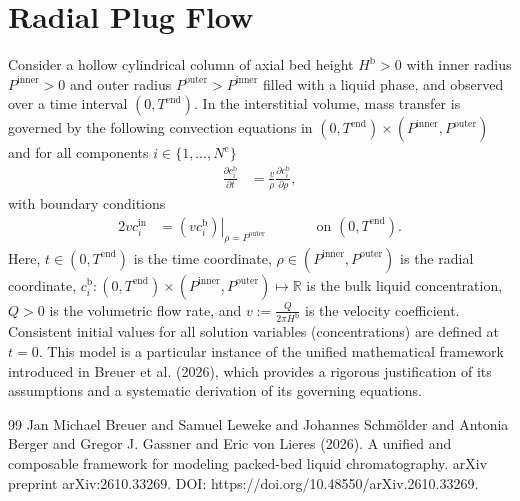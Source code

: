 \documentclass{article}
\begin{document}
\section*{Radial Plug Flow}
Consider a hollow cylindrical column of axial bed height $H^{\mathrm{b}} > 0$ with inner radius $P^{\mathrm{inner}} > 0$ and outer radius $P^{\mathrm{outer}} > P^{\mathrm{inner}}$ filled with a liquid phase, and observed over a time interval $(0, T^{\mathrm{end}})$.
In the interstitial volume, mass transfer is governed by the following convection equations in $(0, T^{\mathrm{end}})\times (P^{\mathrm{inner}}, P^{\mathrm{outer}})$ and for all components $i\in\{1, \dots, N^{\mathrm{c}} \}$
\begin{align}
    \frac{\partial c^{\mathrm{b}}_{i}}{\partial t}
    &= \frac{v}{\rho} \frac{\partial c^{\mathrm{b}}_{i}}{\partial \rho},
\end{align}
with boundary conditions
\begin{alignat}{2}
    v c^{\mathrm{in}}_{i}
    &= \left.\left( v c^{\mathrm{b}}_{i} \right)\right|_{\rho=P^{\mathrm{outer}}}
    & & \qquad\text{on }(0, T^{\mathrm{end}}).
\end{alignat}
Here, $t\in (0, T^{\mathrm{end}})$ is the time coordinate, $\rho\in (P^{\mathrm{inner}}, P^{\mathrm{outer}})$ is the radial coordinate, $c^{\mathrm{b}}_{i}\colon (0, T^{\mathrm{end}})\times (P^{\mathrm{inner}}, P^{\mathrm{outer}}) \mapsto \mathbb{R}$ is the bulk liquid concentration, $Q> 0$ is the volumetric flow rate, and $v:= \frac{Q}{2 \pi H^{\mathrm{b}}}$ is the velocity coefficient.
Consistent initial values for all solution variables (concentrations) are defined at $t = 0$.
This model is a particular instance of the unified mathematical framework introduced in Breuer et al. (2026), which provides a rigorous justification of its assumptions and a systematic derivation of its governing equations.
\begin{thebibliography}{99}
     Jan Michael Breuer and Samuel Leweke and Johannes Schmölder and Antonia Berger and Gregor J. Gassner and Eric von Lieres (2026). A unified and composable framework for modeling packed-bed liquid chromatography. arXiv preprint arXiv:2610.33269. DOI: https://doi.org/10.48550/arXiv.2610.33269.
\end{thebibliography}
\end{document}

